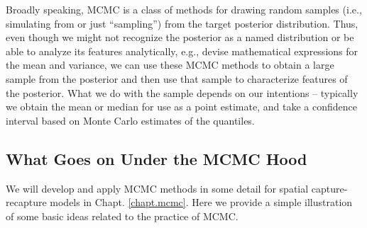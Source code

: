 Broadly speaking, MCMC is a class of methods for drawing random
samples
(i.e., simulating from or just ``sampling'') from the target posterior
distribution.  Thus, even though we might not recognize the posterior
as a named distribution or be able to analyze its features
analytically, e.g., devise mathematical expressions for the mean and
variance, we can use these MCMC methods to obtain a large sample from
the posterior and then use that sample to characterize features of the
posterior. What we do with the sample depends on our intentions --
typically we obtain the mean or median for use as a point estimate,
and take a confidence interval based on Monte Carlo estimates of the
quantiles. 

\subsection{What Goes on Under the MCMC Hood}

We will develop and apply MCMC methods in some detail for spatial
capture-recapture models in Chapt. \ref{chapt.mcmc}. Here we provide
a simple illustration of some basic ideas related to the practice of MCMC.

